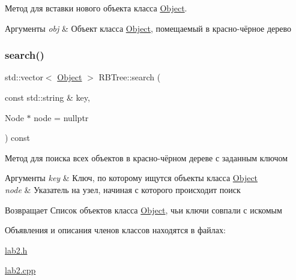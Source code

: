Метод для вставки нового объекта класса \mbox{\hyperlink{structObject}{Object}}. 


\begin{DoxyParams}{Аргументы}
{\em obj} & Объект класса \mbox{\hyperlink{structObject}{Object}}, помещаемый в красно-\/чёрное дерево \\
\hline
\end{DoxyParams}
\mbox{\label{classRBTree_a1afdf2af49051499c00452aa01107255}} 
\subsubsection{\texorpdfstring{search()}{search()}}
{\footnotesize\ttfamily std\+::vector$<$ \mbox{\hyperlink{structObject}{Object}} $>$ R\+B\+Tree\+::search (\begin{DoxyParamCaption}\item[{const std\+::string \&}]{key,  }\item[{Node $\ast$}]{node = {\ttfamily nullptr} }\end{DoxyParamCaption}) const}



Метод для поиска всех объектов в красно-\/чёрном дереве с заданным ключом 


\begin{DoxyParams}{Аргументы}
{\em key} & Ключ, по которому ищутся объекты класса \mbox{\hyperlink{structObject}{Object}} \\
\hline
{\em node} & Указатель на узел, начиная с которого происходит поиск \\
\hline
\end{DoxyParams}
\begin{DoxyReturn}{Возвращает}
Список объектов класса \mbox{\hyperlink{structObject}{Object}}, чьи ключи совпали с искомым 
\end{DoxyReturn}


Объявления и описания членов классов находятся в файлах\+:\begin{DoxyCompactItemize}
\item 
\mbox{\hyperlink{lab2_8h}{lab2.\+h}}\item 
\mbox{\hyperlink{lab2_8cpp}{lab2.\+cpp}}\end{DoxyCompactItemize}

